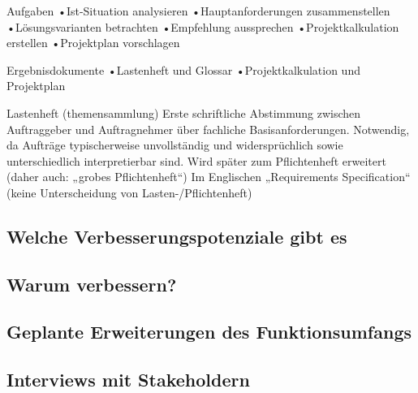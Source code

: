 Aufgaben
•Ist-Situation analysieren
•Hauptanforderungen zusammenstellen
•Lösungsvarianten betrachten
•Empfehlung aussprechen
•Projektkalkulation erstellen
•Projektplan vorschlagen

Ergebnisdokumente
•Lastenheft und Glossar
•Projektkalkulation und Projektplan

Lastenheft (themensammlung)
Erste schriftliche Abstimmung zwischen Auftraggeber und Auftragnehmer über fachliche Basisanforderungen.
Notwendig, da Aufträge typischerweise unvollständig und widersprüchlich sowie unterschiedlich interpretierbar sind.
Wird später zum Pflichtenheft erweitert (daher auch: „grobes Pflichtenheft“)
Im Englischen „Requirements Specification“ (keine Unterscheidung von Lasten-/Pflichtenheft)

\subsection{Welche Verbesserungspotenziale gibt es}

\subsection{Warum verbessern?}

\subsection{Geplante Erweiterungen des Funktionsumfangs}

\subsection{Interviews mit Stakeholdern}